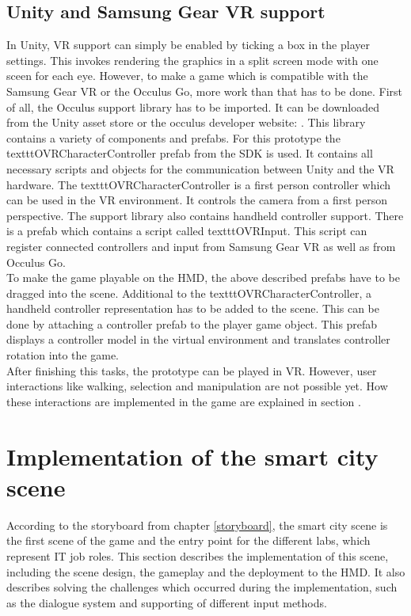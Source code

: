 \subsection{Unity and Samsung Gear VR support} \label{gearvrsupport}
In Unity, VR support can simply be enabled by ticking a box in the player settings. This invokes rendering the graphics in a split screen mode with one sceen for each eye. However, to make a game which is compatible with the Samsung Gear VR or the Occulus Go, more work than that has to be done. First of all, the Occulus support library has to be imported. It can be downloaded from the Unity asset store or the occulus developer website: \cite{Occulus.2018}. This library contains a variety of components and prefabs. For this prototype the texttt{OVRCharacterController} prefab from the SDK is used. It contains all necessary scripts and objects for the communication between Unity and the VR hardware. The texttt{OVRCharacterController} is a first person controller which can be used in the VR environment. It controls the camera from a first person perspective. The support library also contains handheld controller support. There is a prefab which contains a script called texttt{OVRInput}. This script can register connected controllers and input from Samsung Gear VR as well as from Occulus Go.\\
To make the game playable on the HMD, the above described prefabs have to be dragged into the scene. Additional to the  texttt{OVRCharacterController}, a handheld controller representation has to be added to the scene. This can be done by attaching a controller prefab to the player game object. This prefab displays a controller model in the virtual environment and translates controller rotation into the game.\\ After finishing this tasks, the prototype can be played in VR. However, user interactions like walking, selection and manipulation are not possible yet. How these interactions are implemented in the game are explained in section \label{inputmethods}.

\section{Implementation of the smart city scene}
According to the storyboard from chapter \ref{storyboard}, the smart city scene is the first scene of the game and the entry point for the different labs, which represent IT job roles. This section describes the implementation of this scene, including the scene design, the gameplay and the deployment to the HMD. It also describes solving the challenges which occurred during the implementation, such as the dialogue system and supporting of different input methods.
